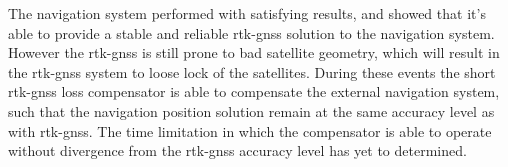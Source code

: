 The navigation system performed with satisfying results, and showed that it's able to provide a stable and reliable \gls{rtk-gnss} solution to the navigation system. However the \gls{rtk-gnss} is still prone to bad satellite geometry, which will result in the \gls{rtk-gnss} system to loose lock of the satellites. During these events the short \gls{rtk-gnss} loss compensator is able to compensate the external navigation system, such that the navigation position solution remain at the same accuracy level as with \gls{rtk-gnss}. The time limitation in which the compensator is able to operate without divergence from the \gls{rtk-gnss} accuracy level has yet to determined.